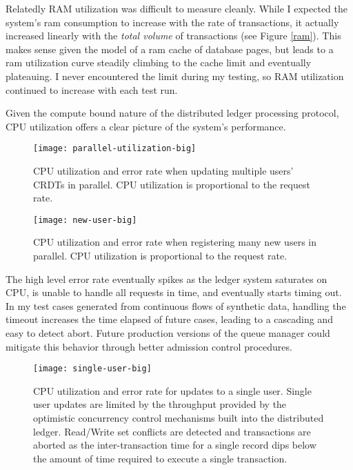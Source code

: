 Relatedly RAM utilization was difficult to measure cleanly. While I
expected the system's ram consumption to increase with the rate of
transactions, it actually increased linearly with the \emph{total
  volume} of transactions (see Figure \ref{ram}). This makes sense given the model of a ram
cache of database pages, but leads to a ram utilization curve steadily
climbing to the cache limit and eventually plateauing. I never
encountered the limit during my testing, so RAM utilization continued
to increase with each test run.

Given the compute bound nature of the distributed ledger processing
protocol, CPU utilization offers a clear picture of the system's performance.

\begin{figure}[t] 
  \texttt{[image: parallel-utilization-big]}
  \vspace{-2em}
  \caption{CPU utilization and error rate when updating multiple
    users' CRDTs in parallel. CPU utilization is proportional to the
    request rate.}
\end{figure}

\begin{figure}[t]
  \texttt{[image: new-user-big]}
  \vspace{-2em}
  \caption{CPU utilization and error rate when registering many new
    users in parallel. CPU utilization is proportional to the request
    rate.}
\end{figure}

The high level error rate eventually spikes as the ledger system
saturates on CPU, is unable to handle all requests in time, and eventually
starts timing out. In my test cases generated from continuous flows of
synthetic data, handling the timeout increases the time elapsed of
future cases, leading to a cascading and easy to detect abort. Future
production versions of the queue manager could mitigate this behavior
through better admission control procedures.

\begin{figure}[t] 
  \texttt{[image: single-user-big]}
  \vspace{-2em}
  \caption{CPU utilization and error rate for updates to a single
    user. Single user updates are limited by the throughput provided
    by the optimistic concurrency control mechanisms built into the
    distributed ledger. Read/Write set conflicts are detected and
    transactions are aborted as the inter-transaction time for a
    single record dips below the amount of time required to execute a
    single transaction.}
  \label{single}
\end{figure}

